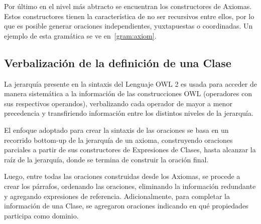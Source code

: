 Por último en el nivel más abtracto se encuentran los constructores de Axiomas. Estos constructores tienen la característica de no ser recursivos entre ellos, por lo que es posible generar oraciones independientes, yuxtapuestas o coordinadas. Un ejemplo de esta gramática se ve en~\ref{gram:axiom}.
\begin{GrammarEnv}
\begin{grammar}
[(colon){$\rightarrow$}]
[(semicolon)$|$]
[(comma){}]
[(period){\vspace{0.3cm} \\}]
[(quote){\begin{bf}}{\end{bf}}]
[(nonterminal){$<$}{$>$}]
\end{grammar}
\label{gram:axiom}
\end{GrammarEnv}

\subsection{Verbalización de la definición de una Clase}
La jerarquía presente en la sintaxis del Lenguaje OWL 2 es usada para acceder de manera sistemática a la información de las construcciones OWL (operadores con sus respectivos operandos), verbalizando cada operador de mayor a menor precedencia y transfiriendo información entre los distintos niveles de la jerarquía. 

El enfoque adoptado para crear la sintaxis de las oraciones se basa en un recorrido bottom-up de la jerarquía de un axioma, construyendo oraciones parciales a partir de sus constructores de Expresiones de Clases, hasta alcanzar la raíz de la jerarquía, donde se termina de construir la oración final. 

Luego, entre todas las oraciones construidas desde los Axiomas, se procede a crear los párrafos, ordenando las oraciones, eliminando la información redundante y agregando expresiones de referencia. Adicionalmente, para completar la información de una Clase, se agregaron oraciones indicando en qué propiedades participa como dominio.

